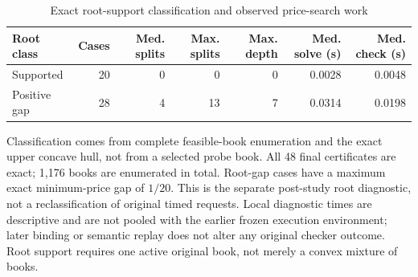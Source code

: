 \documentclass[11pt,letterpaper]{article}
\theoremstyle{definition}\newtheorem{remark}[theorem]{Remark}
\begin{document}
\begin{table}[p]\centering\caption{Exact root-support classification and observed price-search work}\label{tab:root63}
\begin{singlespace}\small\begin{tabular}{lrrrrrr}\toprule
Root class & Cases & Med. splits & Max. splits & Max. depth & Med. solve (s) & Med. check (s)\\\midrule
Supported & 20 & 0 & 0 & 0 & 0.0028 & 0.0048 \\
Positive gap & 28 & 4 & 13 & 7 & 0.0314 & 0.0198 \\
\bottomrule\end{tabular}\par\smallskip\begin{minipage}{\textwidth}\footnotesize Classification comes from complete feasible-book enumeration and the exact upper concave hull, not from a selected probe book. All 48 final certificates are exact; 1,176 books are enumerated in total. Root-gap cases have a maximum exact minimum-price gap of $1/20$. This is the separate post-study root diagnostic, not a reclassification of original timed requests. Local diagnostic times are descriptive and are not pooled with the earlier frozen execution environment; later binding or semantic replay does not alter any original checker outcome. Root support requires one active original book, not merely a convex mixture of books.\end{minipage}\end{singlespace}\end{table}
\end{document}
